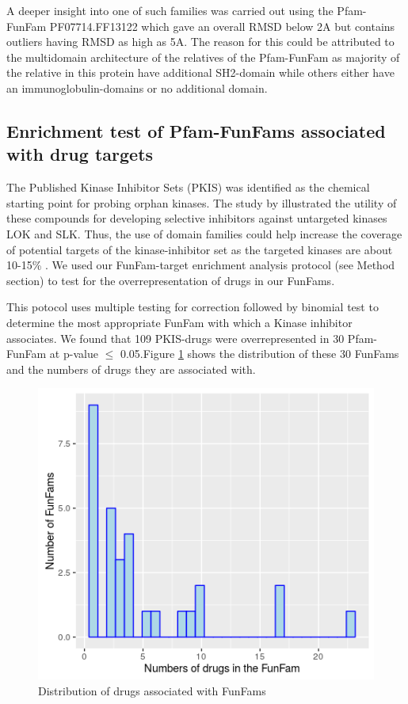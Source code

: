 \documentclass[a4paper, 11pt]{report}
\begin{document}
A deeper insight into one of such families was carried out using the Pfam-FunFam PF07714.FF13122 which gave an overall RMSD below 2A but contains outliers having RMSD as high as 5A. The reason for this could be attributed to the multidomain architecture of the relatives of the Pfam-FunFam as majority of the relative in this protein have additional SH2-domain  while others either have an immunoglobulin-domains or no additional domain.

\subsection{Enrichment test of Pfam-FunFams associated with drug targets}
The Published Kinase Inhibitor Sets (PKIS) was identified as the chemical starting point for probing orphan kinases. The study by \cite{anastassiadis2011comprehensive} illustrated the utility of these compounds for developing selective inhibitors against untargeted kinases LOK and SLK. Thus, the use of domain families could help increase the coverage of potential targets of the kinase-inhibitor set as the targeted kinases are about 10-15\% . We used our FunFam-target enrichment analysis protocol (see Method section) to test for the overrepresentation of drugs in our FunFams. \par This potocol uses multiple testing for correction followed by binomial test to determine the most appropriate FunFam with which a Kinase inhibitor associates. We found that 109 PKIS-drugs were overrepresented in 30 Pfam-FunFam at p-value $\leq$ 0.05.Figure \ref{distdrugFF} shows the distribution of these 30 FunFams and the numbers of drugs they are associated with.
\begin{figure}[H]
	\includegraphics[width=.8\linewidth]{figures/ffdrugdis.png}
	\centering
	\caption{Distribution of drugs associated with FunFams}
	\label{distdrugFF}
\end{figure}
\end{document}
